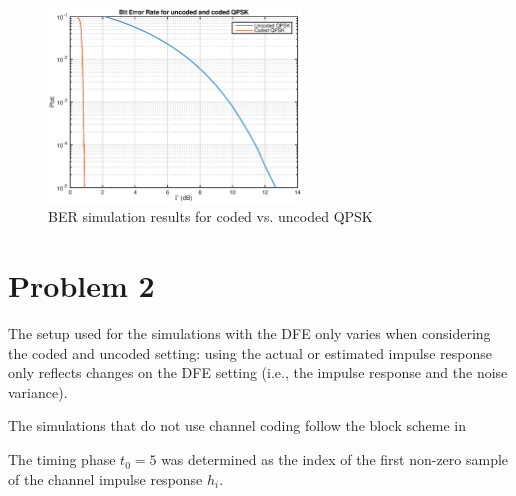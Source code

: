 \documentclass[10pt]{article}
\begin{document}
\begin{figure}
	\centering
	\includegraphics[width = 0.6\textwidth]{problem1}
	\caption{BER simulation results for coded vs. uncoded QPSK}
	\label{fig:problem1_pbit}
\end{figure}




\section*{Problem 2}
The setup used for the simulations with the DFE only varies when considering the coded and uncoded setting: using the actual or estimated impulse response only reflects changes on the DFE setting (i.e., the impulse response and the noise variance). 

The simulations that do not use channel coding follow the block scheme in %

The timing phase $t_0 = 5$ was determined as the index of the first non-zero sample of the channel impulse response ${h_i}$.

\end{document}
